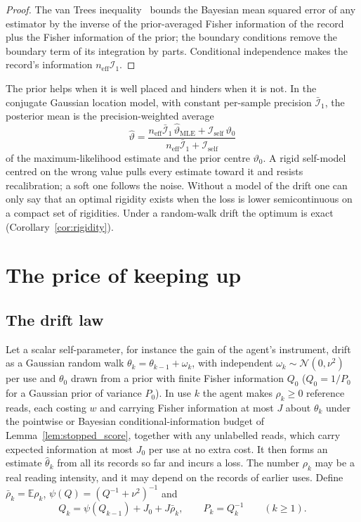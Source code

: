 \documentclass[12pt]{article}
\theoremstyle{definition}
\newcommand{\E}{\mathbb E}
\begin{document}
\begin{proof}
The van Trees inequality~\cite{vanTrees1968} bounds the Bayesian mean squared error of any estimator by the inverse of the prior-averaged Fisher information of the record plus the Fisher information of the prior; the boundary conditions remove the boundary term of its integration by parts. Conditional independence makes the record's information $n_{\mathrm{eff}}\mathcal I_1$.
\end{proof}

The prior helps when it is well placed and hinders when it is not. In the conjugate Gaussian location model, with constant per-sample precision $\bar{\mathcal I}_1$, the posterior mean is the precision-weighted average
\begin{equation}
\label{eq:optimal_estimator}
\hat\vartheta=\frac{n_{\mathrm{eff}}\bar{\mathcal I}_1\,\hat\vartheta_{\mathrm{MLE}}+\mathcal I_{\mathrm{self}}\,\vartheta_0}{n_{\mathrm{eff}}\bar{\mathcal I}_1+\mathcal I_{\mathrm{self}}}
\end{equation}
of the maximum-likelihood estimate and the prior centre $\vartheta_0$. A rigid self-model centred on the wrong value pulls every estimate toward it and resists recalibration; a soft one follows the noise. Without a model of the drift one can only say that an optimal rigidity exists when the loss is lower semicontinuous on a compact set of rigidities. Under a random-walk drift the optimum is exact (Corollary~\ref{cor:rigidity}).

\section{The price of keeping up}
\label{sec:price}

\subsection{The drift law}
\label{subsec:driftlaw}

Let a scalar self-parameter, for instance the gain of the agent's instrument, drift as a Gaussian random walk $\theta_k=\theta_{k-1}+\omega_k$, with independent $\omega_k\sim\mathcal N(0,\nu^2)$ per use and $\theta_0$ drawn from a prior with finite Fisher information $Q_0$ ($Q_0=1/P_0$ for a Gaussian prior of variance $P_0$). In use $k$ the agent makes $\rho_k\ge0$ reference reads, each costing $w$ and carrying Fisher information at most $J$ about $\theta_k$ under the pointwise or Bayesian conditional-information budget of Lemma~\ref{lem:stopped_score}, together with any unlabelled reads, which carry expected information at most $J_0$ per use at no extra cost. It then forms an estimate $\hat\theta_k$ from all its records so far and incurs a loss. The number $\rho_k$ may be a real reading intensity, and it may depend on the records of earlier uses. Define $\bar\rho_k=\E\rho_k$, $\psi(Q)=(Q^{-1}+\nu^2)^{-1}$ and
\begin{equation}
\label{eq:pcrb}
Q_k=\psi(Q_{k-1})+J_0+J\bar\rho_k,\qquad P_k=Q_k^{-1}\qquad(k\ge1).
\end{equation}
\end{document}
